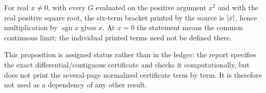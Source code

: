 \begin{proposition}
For real $x\ne0$, with every $G$ evaluated on the positive argument $x^2$ and
with the real positive square root, the six-term bracket printed by the source
is $\left|x\right|$, hence multiplication by $\operatorname{sgn}x$ gives $x$.  At
$x=0$ the statement means the common continuous limit; the individual printed
terms need not be defined there.
\end{proposition}

This proposition is assigned status \statusQ rather than \statusP in the
ledger: the report specifies the exact differential/contiguous certificate and
checks it computationally, but does not print the several-page normalized
certificate term by term.  It is therefore not used as a dependency of any
other result.
